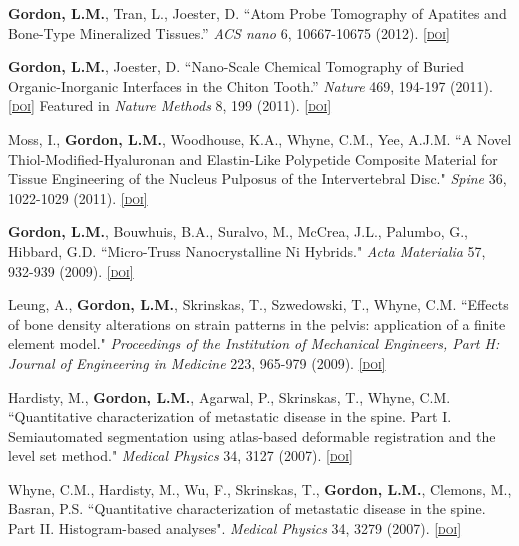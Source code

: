 \textbf{Gordon, L.M.}, Tran, L., Joester, D. “Atom Probe Tomography of Apatites and Bone-Type Mineralized Tissues.” \emph{ACS nano} 6, 10667-10675 (2012). \href{http://dx.doi.org/10.1021/nn3049957}{\textsc{\footnotesize{[doi]}}}

\textbf{Gordon, L.M.}, Joester, D. “Nano-Scale Chemical Tomography of Buried Organic-Inorganic Interfaces in the Chiton Tooth.” \emph{Nature} 469, 194-197 (2011). \href{http://dx.doi.org/10.1038/nature09686}{\textsc{\footnotesize{[doi]}}} Featured in \emph{Nature Methods} 8, 199 (2011). \href{http://dx.doi.org/10.1038/nmeth0311-199}{\textsc{\footnotesize{[doi]}}}

Moss, I., \textbf{Gordon, L.M.}, Woodhouse, K.A., Whyne, C.M., Yee, A.J.M. ``A Novel Thiol-Modified-Hyaluronan and Elastin-Like Polypetide Composite Material for Tissue Engineering of the Nucleus Pulposus of the Intervertebral Disc." \emph{Spine} 36, 1022-1029 (2011). \href{http://dx.doi.org/10.1097/BRS.0b013e3181e7b705}{\textsc{\footnotesize{[doi]}}}

\textbf{Gordon, L.M.}, Bouwhuis, B.A., Suralvo, M., McCrea, J.L., Palumbo, G., Hibbard, G.D. ``Micro-Truss Nanocrystalline Ni Hybrids." \emph{Acta Materialia} 57, 932-939 (2009). \href{http://dx.doi.org/10.1016/j.actamat.2008.10.038}{\textsc{\footnotesize{[doi]}}}

Leung, A., \textbf{Gordon, L.M.}, Skrinskas, T., Szwedowski, T., Whyne, C.M. ``Effects of bone density alterations on strain patterns in the pelvis: application of a finite element model." \emph{Proceedings of the Institution of Mechanical Engineers, Part H: Journal of Engineering in Medicine} 223, 965-979 (2009). \href{http://dx.doi.org/10.1243/09544119JEIM618}{\textsc{\footnotesize{[doi]}}}

Hardisty, M., \textbf{Gordon, L.M.}, Agarwal, P., Skrinskas, T., Whyne, C.M. ``Quantitative characterization of metastatic disease in the spine. Part I. Semiautomated segmentation using atlas-based deformable registration and the level set method." \emph{Medical Physics} 34, 3127 (2007). \href{http://dx.doi.org/10.1118/1.2746498}{\textsc{\footnotesize{[doi]}}}

Whyne, C.M., Hardisty, M., Wu, F., Skrinskas, T., \textbf{Gordon, L.M.}, Clemons, M., Basran, P.S. ``Quantitative characterization of metastatic disease in the spine. Part II. Histogram-based analyses". \emph{Medical Physics} 34, 3279 (2007). \href{http://dx.doi.org/10.1118/1.2756939}{\textsc{\footnotesize{[doi]}}}
\endgroup

